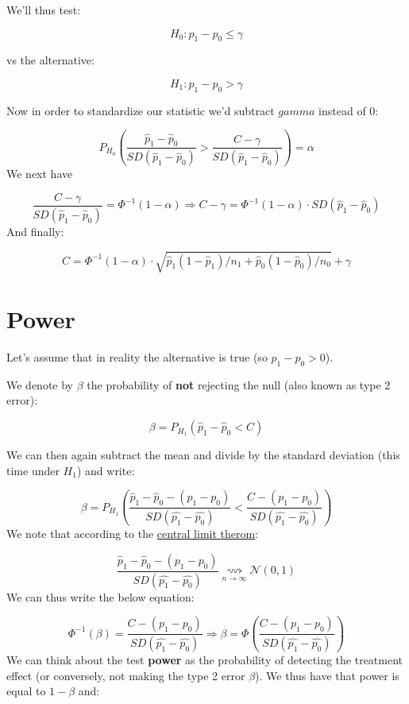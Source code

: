 \documentclass[
]{article}
\begin{document}
We'll thus test:

\[H_0:p_1-p_0 \leq \gamma\]

vs the alternative:

\[H_1:p_1-p_0 > \gamma\]

Now in order to standardize our statistic we'd subtract \(gamma\)
instead of 0:

\[P_{H_0}\left(\frac{\hat{p}_1-\hat{p}_0}{SD(\hat{p}_1-\hat{p}_0)}>\frac{C - \gamma}{SD(\hat{p}_1-\hat{p}_0)}\right)=\alpha\]
We next have

\[\frac{C - \gamma}{SD(\hat{p}_1-\hat{p}_0)} = \Phi^{-1}(1 - \alpha) \Rightarrow C - \gamma = \Phi^{-1}(1 - \alpha) \cdot SD(\hat{p}_1-\hat{p}_0)\]
And finally:

\[\boxed{C = \Phi^{-1}(1 - \alpha) \cdot \sqrt{\hat{p}_1(1-\hat{p}_1)/n_1 + \hat{p}_0(1-\hat{p}_0)/n_0} + \gamma}\]

\hypertarget{power}{%
\section{Power}\label{power}}

Let's assume that in reality the alternative is true (so
\(p_1 - p_0 > 0\)).

We denote by \(\beta\) the probability of \textbf{not} rejecting the
null (also known as type 2 error):

\[\beta = P_{H_1}\left(\hat{p}_1-\hat{p}_0 < C\right)\]

We can then again subtract the mean and divide by the standard deviation
(this time under \(H_1\)) and write:

\[\beta = P_{H_1}\left(\frac{\hat{p}_1-\hat{p}_0 - (p_1 - p_0)}{SD(\hat{p_1} - \hat{p_0})} < \frac{C - (p_1 - p_0)}{SD(\hat{p_1} - \hat{p_0})} \right)\]
We note that according to the
\href{https://en.wikipedia.org/wiki/Central_limit_theorem}{central limit
therom}:

\[\frac{\hat{p}_1-\hat{p}_0 - (p_1 - p_0)}{SD(\hat{p_1} - \hat{p_0})} \underset{n \rightarrow\infty}{\rightsquigarrow} \mathcal{N}(0,1)\]
We can thus write the below equation:

\[\Phi^{-1}(\beta) = \frac{C - (p_1 - p_0)}{SD(\hat{p_1} - \hat{p_0})} \Rightarrow \beta = \Phi\left(\frac{C - (p_1 - p_0)}{SD(\hat{p_1} - \hat{p_0})}\right)\]
We can think about the test \textbf{power} as the probability of
detecting the treatment effect (or conversely, not making the type 2
error \(\beta\)). We thus have that power is equal to \(1-\beta\) and:
\end{document}
